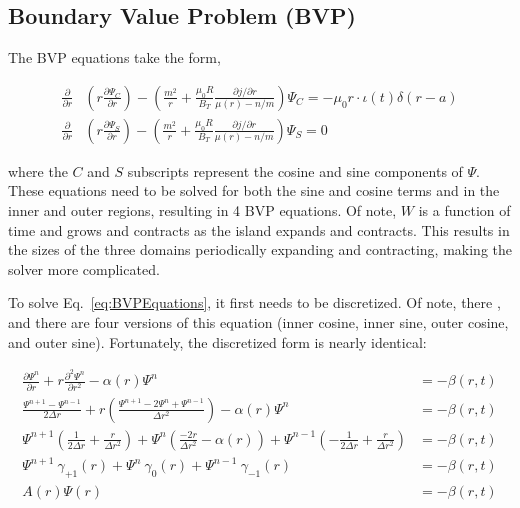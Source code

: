 \documentclass{article}
\begin{document}
\subsection{Boundary Value Problem (BVP)}


The BVP equations take the form,


\begin{equation} \label{eq:BVPEquations}
\begin{split}
\frac{\partial}{\partial r} &  \left( r \frac{\partial \Psi_C}{\partial r} \right)-\left( \frac{m^2}{r} +\frac{\mu_0 R}{B_T} \frac{\partial j / \partial r}{\mu(r)-n/m} \right) \Psi_C  = - \mu_0r \cdot \iota(t) \delta (r-a)  \\
 \frac{\partial}{\partial r} &  \left( r \frac{\partial \Psi_S}{\partial r} \right)-\left( \frac{m^2}{r} +\frac{\mu_0 R}{B_T} \frac{\partial j / \partial r}{\mu(r)-n/m} \right) \Psi_S =0
\end{split}
\end{equation}

\noindent where the $C$ and $S$ subscripts represent the cosine and sine components of $\Psi$.  These equations need to be solved for both the sine and cosine terms and in the inner and outer regions, resulting in 4 BVP equations.  Of note, $W$ is a function of time and grows and contracts as the island expands and contracts.  This results in the sizes of the three domains periodically expanding and contracting, making the solver more complicated.   

To solve Eq.~\ref{eq:BVPEquations}, it first needs to be discretized.  Of note, there , and there are four versions of this equation (inner cosine, inner sine, outer cosine, and outer sine).  Fortunately, the discretized form is nearly identical:


\begin{equation} \label{eq:BVPSolved}
\begin{split}
 \frac{\partial \Psi^n}{\partial r} + r \frac{\partial^2 \Psi^n}{\partial r^2} -\alpha(r)  \Psi^n  & = - \beta(r,t) \\ 
 \frac{\Psi^{n+1}-\Psi^{n-1}}{2\Delta r}+r\left(\frac{\Psi^{n+1}-2\Psi^{n}+\Psi^{n-1}}{\Delta r^2}\right)-\alpha(r)\Psi^n & = - \beta(r,t)  \\
  \Psi^{n+1}\left(\frac{1}{2 \Delta r}+\frac{r}{\Delta r^2 }\right) + \Psi^n\left( \frac{-2r}{\Delta r^2} -\alpha(r) \right) + \Psi^{n-1}\left(-\frac{1}{2\Delta r} + \frac{r}{\Delta r^2} \right) & = - \beta(r,t) \\
  \Psi^{n+1} \ \gamma_{+1}(r) + \Psi^n \ \gamma_{0}(r) + \Psi^{n-1} \ \gamma_{-1}(r) & = - \beta(r,t) \\
A(r) \Psi(r) & = -\beta(r,t) \\
\end{split}
\end{equation}
\end{document}

